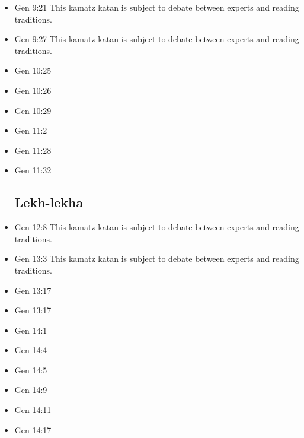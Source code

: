 \documentclass[14pt]{book}
\begin{document}
\begin{multicols}{2}
\begin{itemize}
\item Gen 9:21 This kamatz katan is subject to debate between experts and reading traditions.

\item Gen 9:27 This kamatz katan is subject to debate between experts and reading traditions.

\item Gen 10:25

\item Gen 10:26

\item Gen 10:29

\item Gen 11:2

\item Gen 11:28

\item Gen 11:32

\subsection{Lekh-lekha}

\item Gen 12:8 This kamatz katan is subject to debate between experts and reading traditions.

\item Gen 13:3 This kamatz katan is subject to debate between experts and reading traditions.

\item Gen 13:17

\item Gen 13:17

\item Gen 14:1

\item Gen 14:4

\item Gen 14:5

\item Gen 14:9

\item Gen 14:11

\item Gen 14:17


\end{itemize}
\end{multicols}
\end{document}
